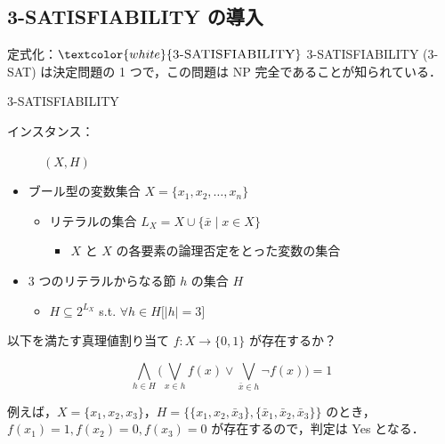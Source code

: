 \documentclass[dvipdfmx]{beamer}
\begin{document}
    \subsection{\textsc{3-SATISFIABILITY} の導入}
    \begin{frame}{定式化：${\textcolor{white}{\mbox {\sc 3-SATISFIABILITY}}}$}
      \textsc{3-SATISFIABILITY (3-SAT) } は決定問題の 1 つで，この問題は NP 完全であることが知られている．
      \begin{block}{\textsc{3-SATISFIABILITY}}
        \begin{description}
          \item[インスタンス：] $(X,H)$
          \vspace{-2mm}
        \end{description}
        \begin{itemize}
          \item ブール型の変数集合 $X=\{x_1,x_2,\dots ,x_n\}$
          \begin{itemize}
            \item リテラルの集合 $L_X = X \cup \{\bar x \mid x \in X\}$
            \begin{itemize}
              \item $X$ と $X$ の各要素の論理否定をとった変数の集合
            \end{itemize}
          \end{itemize}
          \item 3 つのリテラルからなる節 $h$ の集合 $H$
          \begin{itemize}
            \item $H \subseteq 2^{L_X}$ s.t. $\forall h \in H \big[|h| = 3\big]$
          \end{itemize}
        \end{itemize}
        \begin{description}
          \setlength{\leftskip}{-8mm}
          \item[問題：] 以下を満たす真理値割り当て $f : X \to \{0,1\}$ が存在するか？
        \end{description}
        $$\displaystyle \bigwedge_{h \in H} \bigg(\bigvee_{x \in h}f(x) \lor \bigvee_{\bar x \in h}\lnot f(x) \bigg) = 1$$
      \end{block}

      例えば，$X = \{x_1,x_2,x_3\}$，$H = \big\{ \{x_1, x_2, \bar x_3\}, \{\bar x_1, \bar x_2,\bar x_3\}\big\}$ のとき，
      $f(x_1) = 1, f(x_2) = 0, f(x_3) = 0$ が存在するので，判定は Yes となる．
    \end{frame}
\end{document}

